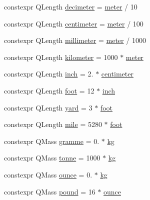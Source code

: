 \begin{DoxyCompactItemize}
constexpr Q\+Length \mbox{\hyperlink{namespaceokapi_adeefe08fd5193fd9090e198b1a3463b9}{decimeter}} = \mbox{\hyperlink{namespaceokapi_a59563b3d4b18633f1c8d852e2932d1db}{meter}} / 10
\item 
constexpr Q\+Length \mbox{\hyperlink{namespaceokapi_a889129a4ecb3e93c695c8eea53b96602}{centimeter}} = \mbox{\hyperlink{namespaceokapi_a59563b3d4b18633f1c8d852e2932d1db}{meter}} / 100
\item 
constexpr Q\+Length \mbox{\hyperlink{namespaceokapi_a9343219094a8231c1e3bc95505ba1227}{millimeter}} = \mbox{\hyperlink{namespaceokapi_a59563b3d4b18633f1c8d852e2932d1db}{meter}} / 1000
\item 
constexpr Q\+Length \mbox{\hyperlink{namespaceokapi_a05acd5fc8bdc7fe19d03a5241ae4bbc7}{kilometer}} = 1000 $\ast$ \mbox{\hyperlink{namespaceokapi_a59563b3d4b18633f1c8d852e2932d1db}{meter}}
\item 
constexpr Q\+Length \mbox{\hyperlink{namespaceokapi_a7da6f1f2fa46ec3694ba3f5361bcba80}{inch}} = 2. $\ast$ \mbox{\hyperlink{namespaceokapi_a889129a4ecb3e93c695c8eea53b96602}{centimeter}}
\item 
constexpr Q\+Length \mbox{\hyperlink{namespaceokapi_a76974d5bf7ed9473b2d59153894a8587}{foot}} = 12 $\ast$ \mbox{\hyperlink{namespaceokapi_a7da6f1f2fa46ec3694ba3f5361bcba80}{inch}}
\item 
constexpr Q\+Length \mbox{\hyperlink{namespaceokapi_a2e7618c6657c2a4c9d267a045f627f1e}{yard}} = 3 $\ast$ \mbox{\hyperlink{namespaceokapi_a76974d5bf7ed9473b2d59153894a8587}{foot}}
\item 
constexpr Q\+Length \mbox{\hyperlink{namespaceokapi_adb797d6d549d23e9b2e6c817a07ddfba}{mile}} = 5280 $\ast$ \mbox{\hyperlink{namespaceokapi_a76974d5bf7ed9473b2d59153894a8587}{foot}}
\item 
constexpr Q\+Mass \mbox{\hyperlink{namespaceokapi_a494f6de7e44c5a31663ff887d5dc73fb}{gramme}} = 0. $\ast$ \mbox{\hyperlink{namespaceokapi_afcc67eb55c70e21f82cbee49aa19d05a}{kg}}
\item 
constexpr Q\+Mass \mbox{\hyperlink{namespaceokapi_a01ec1e54d8c7735cc150c1d7a06eced6}{tonne}} = 1000 $\ast$ \mbox{\hyperlink{namespaceokapi_afcc67eb55c70e21f82cbee49aa19d05a}{kg}}
\item 
constexpr Q\+Mass \mbox{\hyperlink{namespaceokapi_aa03bea36d07db8710819da96fe675a74}{ounce}} = 0. $\ast$ \mbox{\hyperlink{namespaceokapi_afcc67eb55c70e21f82cbee49aa19d05a}{kg}}
\item 
constexpr Q\+Mass \mbox{\hyperlink{namespaceokapi_a15f5612272759c7efdcab4bae5b4fa09}{pound}} = 16 $\ast$ \mbox{\hyperlink{namespaceokapi_aa03bea36d07db8710819da96fe675a74}{ounce}}

\end{DoxyCompactItemize}
